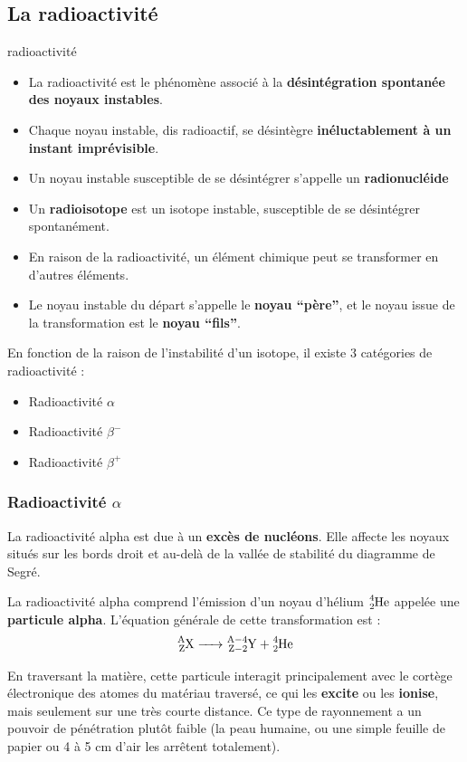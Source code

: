 \documentclass[11pt,a4paper]{article}
\begin{document}
\subsection{La radioactivité}

\begin{defn}{radioactivité}
\begin{itemize}
    \item La radioactivité est le phénomène associé à la \textbf{désintégration spontanée des noyaux instables}.
    \item Chaque noyau instable, dis radioactif, se désintègre \textbf{inéluctablement à un instant imprévisible}.
    \item Un noyau instable susceptible de se désintégrer s'appelle un \textbf{radionucléide}
    \item Un \textbf{radioisotope} est un isotope instable, susceptible de se désintégrer spontanément. 
    \item En raison de la radioactivité, un élément chimique peut se transformer en d'autres éléments.    
    \item Le noyau instable du départ s'appelle le \textbf{noyau ``père''}, et le noyau issue de la transformation est le \textbf{noyau ``fils''}. 
\end{itemize}
\end{defn}

En fonction de la raison de l'instabilité d'un isotope, il existe 3 catégories de radioactivité : 
\begin{itemize}
    \item Radioactivité $\alpha$
    \item Radioactivité $\beta^-$
    \item Radioactivité $\beta^+$
\end{itemize}

\subsubsection{Radioactivité $\alpha$}

La radioactivité alpha est due à un \textbf{excès de nucléons}. Elle affecte les noyaux situés sur les bords droit et au-delà de la vallée de stabilité du diagramme de Segré.

La radioactivité alpha comprend l'émission d'un noyau d'hélium $\ce{^4_2He}$ appelée une \textbf{particule alpha}.  L'équation générale de cette transformation est : 
\[\ce{^A_ZX -> ^{A-4}_{Z-2}Y + ^4_2He}\]

En traversant la matière, cette particule interagit principalement avec le cortège électronique des atomes du matériau traversé, ce qui les \textbf{excite} ou les \textbf{ionise}, mais seulement sur une très courte distance. Ce type de rayonnement a un pouvoir de pénétration plutôt faible (la peau humaine, ou une simple feuille de papier ou 4 à 5 cm d'air les arrêtent totalement).
\end{document}
